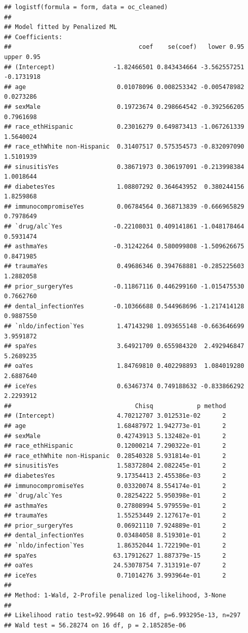 \documentclass[
]{article}
\begin{document}
\begin{verbatim}
## logistf(formula = form, data = oc_cleaned)
## 
## Model fitted by Penalized ML
## Coefficients:
##                                   coef    se(coef)   lower 0.95 upper 0.95
## (Intercept)                -1.82466501 0.843434664 -3.562557251 -0.1731918
## age                         0.01078096 0.008253342 -0.005478982  0.0273286
## sexMale                     0.19723674 0.298664542 -0.392566205  0.7961698
## race_ethHispanic            0.23016279 0.649873413 -1.067261339  1.5640024
## race_ethWhite non-Hispanic  0.31407517 0.575354573 -0.832097090  1.5101939
## sinusitisYes                0.38671973 0.306197091 -0.213998384  1.0018644
## diabetesYes                 1.08807292 0.364643952  0.380244156  1.8259868
## immunocompromiseYes         0.06784564 0.368713839 -0.666965829  0.7978649
## `drug/alc`Yes              -0.22108031 0.409141861 -1.048178464  0.5931474
## asthmaYes                  -0.31242264 0.580099808 -1.509626675  0.8471985
## traumaYes                   0.49686346 0.394768881 -0.285225603  1.2882058
## prior_surgeryYes           -0.11867116 0.446299160 -1.015475530  0.7662760
## dental_infectionYes        -0.10366688 0.544968696 -1.217414128  0.9887550
## `nldo/infection`Yes         1.47143298 1.093655148 -0.663646699  3.9591872
## spaYes                      3.64921709 0.655984320  2.492946847  5.2689235
## oaYes                       1.84769810 0.402298893  1.084019280  2.6887640
## iceYes                      0.63467374 0.749188632 -0.833866292  2.2293912
##                                  Chisq            p method
## (Intercept)                 4.70212707 3.012531e-02      2
## age                         1.68487972 1.942773e-01      2
## sexMale                     0.42743913 5.132482e-01      2
## race_ethHispanic            0.12000214 7.290322e-01      2
## race_ethWhite non-Hispanic  0.28540328 5.931814e-01      2
## sinusitisYes                1.58372804 2.082245e-01      2
## diabetesYes                 9.17354413 2.455386e-03      2
## immunocompromiseYes         0.03320074 8.554174e-01      2
## `drug/alc`Yes               0.28254222 5.950398e-01      2
## asthmaYes                   0.27808994 5.979559e-01      2
## traumaYes                   1.55253449 2.127617e-01      2
## prior_surgeryYes            0.06921110 7.924889e-01      2
## dental_infectionYes         0.03484058 8.519301e-01      2
## `nldo/infection`Yes         1.86352044 1.722190e-01      2
## spaYes                     63.17912627 1.887379e-15      2
## oaYes                      24.53078754 7.313191e-07      2
## iceYes                      0.71014276 3.993964e-01      2
## 
## Method: 1-Wald, 2-Profile penalized log-likelihood, 3-None
## 
## Likelihood ratio test=92.99648 on 16 df, p=6.993295e-13, n=297
## Wald test = 56.28274 on 16 df, p = 2.185285e-06
\end{verbatim}
\end{document}
